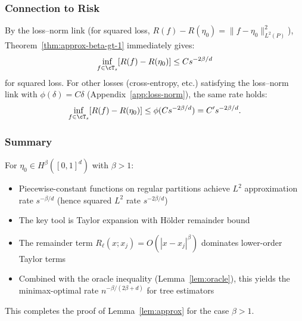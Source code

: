 \subsubsection{Connection to Risk}

By the loss--norm link (for squared loss, $R(f) - R(\eta_0) = \|f - \eta_0\|_{L^2(P)}^2$), Theorem~\ref{thm:approx-beta-gt-1} immediately gives:
\[
\inf_{f \in \cT_s} [R(f) - R(\eta_0)] \le C s^{-2\beta/d}
\]
for squared loss. For other losses (cross-entropy, etc.) satisfying the loss--norm link with $\phi(\delta) = C\delta$ (Appendix~\ref{app:loss-norm}), the same rate holds:
\[
\inf_{f \in \cT_s} [R(f) - R(\eta_0)] \le \phi(C s^{-2\beta/d}) = C' s^{-2\beta/d}.
\]

\subsubsection{Summary}

For $\eta_0 \in H^\beta([0,1]^d)$ with $\beta > 1$:
\begin{itemize}
\item Piecewise-constant functions on regular partitions achieve $L^2$ approximation rate $s^{-\beta/d}$ (hence squared $L^2$ rate $s^{-2\beta/d}$)
\item The key tool is Taylor expansion with Hölder remainder bound
\item The remainder term $R_\ell(x; x_j) = O(|x-x_j|^\beta)$ dominates lower-order Taylor terms
\item Combined with the oracle inequality (Lemma~\ref{lem:oracle}), this yields the minimax-optimal rate $n^{-\beta/(2\beta+d)}$ for tree estimators
\end{itemize}

This completes the proof of Lemma~\ref{lem:approx} for the case $\beta > 1$.
